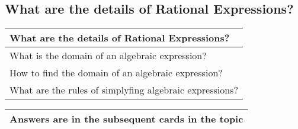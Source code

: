 \subsection{What are the details of Rational Expressions?}
\begin{small}
    \begin{tabularx}{1\textwidth}{
            p{}
        }
        \toprule
        \textbf{What are the details of Rational Expressions?}
        \\
        \midrule

        What is the domain of an algebraic expression?
        \\
        \midrule

        How to find the domain of an algebraic expression?
        \\
        \midrule

        What are the rules of simplyfing algebraic expressions?
        \\
        \bottomrule

    \end{tabularx}
\end{small}
\begin{small}
    \begin{tabularx}{1\textwidth}{
            p{}
        }
        \toprule
        Answers are in the subsequent cards in the topic
        \\
        \bottomrule

    \end{tabularx}
\end{small}
